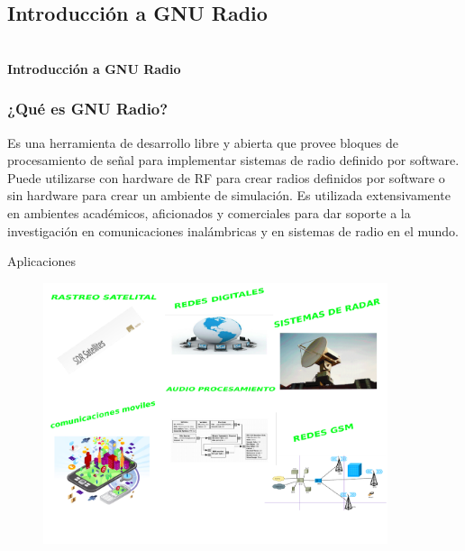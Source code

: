 \subsection{Introducción a GNU Radio}

\begin{frame}{}


\bfseries{\textrm{\Large \\Introducción a GNU Radio}}
\raggedright
\end{frame}



\begin{frame}
  
  
  \frametitle{¿Qué es GNU Radio?}

  
  Es una herramienta de desarrollo libre y abierta que provee bloques de procesamiento de señal para implementar sistemas de radio definido por software. Puede utilizarse con hardware de RF para crear radios definidos por
software o sin hardware para crear un ambiente de simulación. Es utilizada
extensivamente en ambientes académicos, aficionados y comerciales para dar
soporte a la investigación en comunicaciones inalámbricas y en sistemas de
radio en el mundo.
\end{frame}



\begin{frame}{Aplicaciones}
  \begin{figure}[H]
  \centering
  \includegraphics[width=0.9\textwidth]{parte1/intro/pdf/intro.pdf}
  \end{figure}
  
  
\end{frame}



